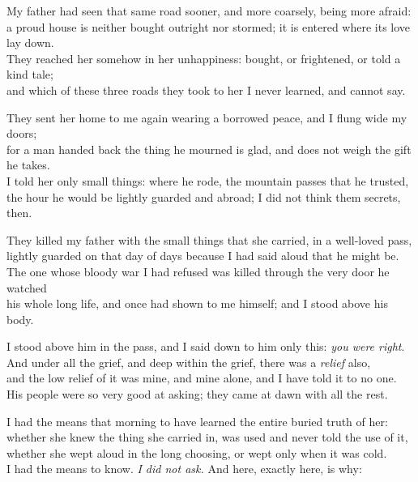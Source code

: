 \begin{scripture}
My father had seen that same road sooner, and more coarsely, being more afraid: \\
a proud house is neither bought outright nor stormed; it is entered where its love lay down. \\
They reached her somehow in her unhappiness: bought, or frightened, or told a kind tale; \\
and which of these three roads they took to her I never learned, and cannot say. \\
\medskip

They sent her home to me again wearing a borrowed peace, and I flung wide my doors; \\
for a man handed back the thing he mourned is glad, and does not weigh the gift he takes. \\
I told her only small things: where he rode, the mountain passes that he trusted, \\
the hour he would be lightly guarded and abroad; I did not think them secrets, then. \\
\medskip

They killed my father with the small things that she carried, in a well-loved pass, \\
lightly guarded on that day of days because I had said aloud that he might be. \\
The one whose bloody war I had refused was killed through the very door he watched \\
his whole long life, and once had shown to me himself; and I stood above his body. \\
\medskip

I stood above him in the pass, and I said down to him only this: \emph{you were right}. \\
And under all the grief, and deep within the grief, there was a \emph{relief} also, \\
and the low relief of it was mine, and mine alone, and I have told it to no one. \\
His people were so very good at asking; they came at dawn with all the rest. \\
\medskip

I had the means that morning to have learned the entire buried truth of her: \\
whether she knew the thing she carried in, was used and never told the use of it, \\
whether she wept aloud in the long choosing, or wept only when it was cold. \\
I had the means to know. \emph{I did not ask.} And here, exactly here, is why: \\
\medskip


\end{scripture}
